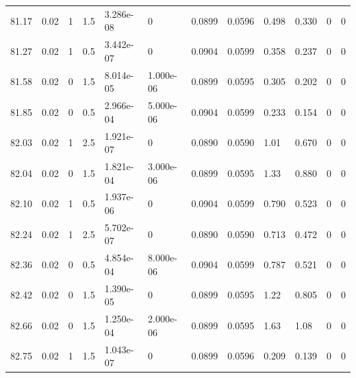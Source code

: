 \documentclass[preview]{standalone}
\begin{document}
{{{{{{{{{{{{{{{{\begin{tabular}{L{1.2cm}C{1.2cm} C{0.3cm}C{0.5cm} C{1.4cm}C{1.4cm} C{1.4cm}C{1.4cm} C{1.6cm}C{1.6cm} C{1.6cm}C{1.6cm}}
  81.17  &  0.02  & 1     & 1.5 &  3.286e-08  & 0  &  0.0899&   0.0596& 0.498 & 0.330   &  0 & 0  \\ 
  81.27  &  0.02  & 1     & 0.5 &  3.442e-07  & 0  &  0.0904&   0.0599& 0.358 & 0.237   &  0 & 0  \\ 
  81.58  &  0.02  & 0     & 1.5 &  8.014e-05  & 1.000e-06  &  0.0899&   0.0595& 0.305 & 0.202   &  0 & 0  \\ 
  81.85  &  0.02  & 0     & 0.5 &  2.966e-04  & 5.000e-06  &  0.0904&   0.0599& 0.233 & 0.154   &  0 & 0  \\ 
  82.03  &  0.02  & 1     & 2.5 &  1.921e-07  & 0  &  0.0890&   0.0590& 1.01 & 0.670   &  0 & 0  \\ 
  82.04  &  0.02  & 0     & 1.5 &  1.821e-04  & 3.000e-06  &  0.0899&   0.0595& 1.33 & 0.880   &  0 & 0  \\ 
  82.10  &  0.02  & 1     & 0.5 &  1.937e-06  & 0  &  0.0904&   0.0599& 0.790 & 0.523   &  0 & 0  \\ 
  82.24  &  0.02  & 1     & 2.5 &  5.702e-07  & 0  &  0.0890&   0.0590& 0.713 & 0.472   &  0 & 0  \\ 
  82.36  &  0.02  & 0     & 0.5 &  4.854e-04  & 8.000e-06  &  0.0904&   0.0599& 0.787 & 0.521   &  0 & 0  \\ 
  82.42  &  0.02  & 0     & 1.5 &  1.390e-05  & 0  &  0.0899&   0.0595& 1.22 & 0.805   &  0 & 0  \\ 
  82.66  &  0.02  & 0     & 1.5 &  1.250e-04  & 2.000e-06  &  0.0899&   0.0595& 1.63 & 1.08   &  0 & 0  \\ 
  82.75  &  0.02  & 1     & 1.5 &  1.043e-07  & 0  &  0.0899&   0.0596& 0.209 & 0.139   &  0 & 0  \\ 
\hline 
\end{tabular} 

}}}}}}}}}}}}}}}}
\end{document}
